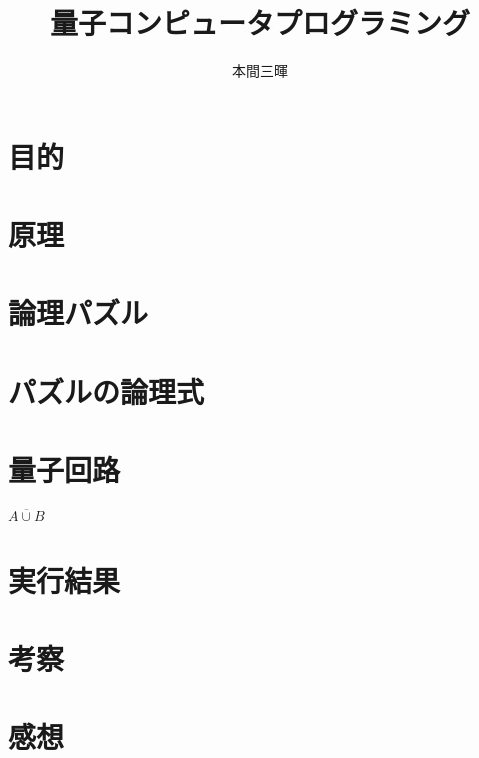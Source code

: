 \documentclass[titlepage,a4paper]{jsarticle}
\title{量子コンピュータプログラミング}
\author{本間三暉}
\begin{document}
\maketitle
\section{目的}

\section{原理}
\section{論理パズル}
\section{パズルの論理式}
\section{量子回路}
$\overline{A \cup B}$
\section{実行結果}
\section{考察}
\section{感想}
\end{document}
